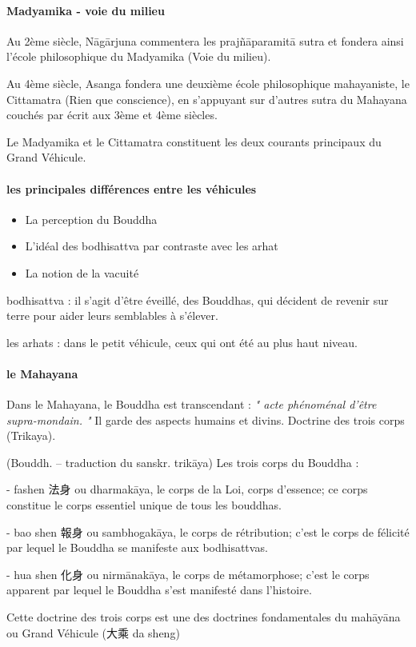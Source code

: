 \paragraph{Madyamika - voie du milieu} 	Au 2ème siècle, Nāgārjuna commentera les prajñāparamitā sutra et fondera ainsi l’école philosophique du Madyamika (Voie du milieu).

 Au 4ème siècle, Asanga fondera une deuxième école philosophique mahayaniste, le Cittamatra (Rien que conscience), en s’appuyant sur d’autres sutra du Mahayana couchés par écrit aux 3ème et 4ème siècles.
 
 Le Madyamika et le Cittamatra constituent les deux courants principaux du Grand Véhicule.

\paragraph{les principales différences entre les véhicules}

\begin{itemize}
    \item  La perception du Bouddha
   \item L’idéal des bodhisattva par contraste avec les arhat
   \item 	La notion de la vacuité
\end{itemize}


bodhisattva : il s'agit d'être éveillé, des Bouddhas, qui décident de revenir sur terre pour aider leurs semblables à s'élever.

les arhats : dans le petit véhicule, ceux qui ont été au plus haut niveau. 

\paragraph{le Mahayana}

Dans le Mahayana, le Bouddha est transcendant : \textit{" acte phénoménal d'être supra-mondain. "} Il garde des aspects humains et divins. Doctrine des trois corps (Trikaya). 

\begin{Def}[sanshen 三身]
    (Bouddh. – traduction du sanskr. trikāya)	Les trois corps du Bouddha :	
    
    - fashen 法身 ou dharmakāya, le corps de la Loi, corps d’essence; ce corps constitue le corps essentiel unique de tous les bouddhas. 
    
    - bao shen 報身 ou sambhogakāya, le corps de rétribution; c’est le corps de félicité par lequel le Bouddha se manifeste aux bodhisattvas. 
    
    - hua shen 化身 ou nirmānakāya, le corps de métamorphose; c’est le corps apparent par lequel le Bouddha s’est manifesté dans l’histoire. 
    
    Cette doctrine des trois corps est une des doctrines fondamentales du mahāyāna ou Grand Véhicule (大乘 da sheng) 
\end{Def}


